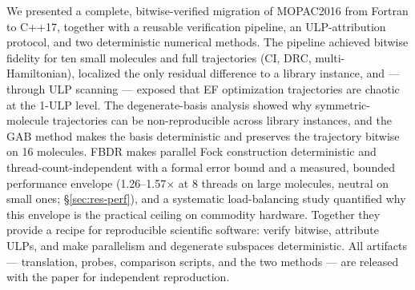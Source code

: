 \documentclass[preprint,12pt]{elsarticle}
\begin{document}
We presented a complete, bitwise-verified migration of MOPAC2016 from Fortran to C++17, together with a reusable verification pipeline, an ULP-attribution protocol, and two deterministic numerical methods. The pipeline achieved bitwise fidelity for ten small molecules and full trajectories (CI, DRC, multi-Hamiltonian), localized the only residual difference to a library instance, and --- through ULP scanning --- exposed that EF optimization trajectories are chaotic at the 1-ULP level. The degenerate-basis analysis showed why symmetric-molecule trajectories can be non-reproducible across library instances, and the GAB method makes the basis deterministic and preserves the trajectory bitwise on 16 molecules. FBDR makes parallel Fock construction deterministic and thread-count-independent with a formal error bound and a measured, bounded performance envelope (1.26--1.57$\times$ at 8 threads on large molecules, neutral on small ones; \S\ref{sec:res-perf}), and a systematic load-balancing study quantified why this envelope is the practical ceiling on commodity hardware. Together they provide a recipe for reproducible scientific software: verify bitwise, attribute ULPs, and make parallelism and degenerate subspaces deterministic. All artifacts --- translation, probes, comparison scripts, and the two methods --- are released with the paper for independent reproduction.

\end{document}
